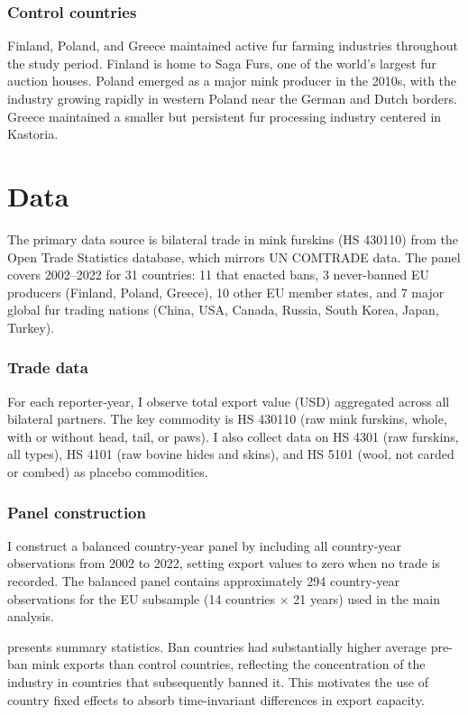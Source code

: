 \documentclass[12pt]{article}
\begin{document}
\subsubsection*{Control countries} Finland, Poland, and Greece maintained active fur farming industries throughout the study period. Finland is home to Saga Furs, one of the world's largest fur auction houses. Poland emerged as a major mink producer in the 2010s, with the industry growing rapidly in western Poland near the German and Dutch borders. Greece maintained a smaller but persistent fur processing industry centered in Kastoria.

\section{Data}\label{sec:data}

The primary data source is bilateral trade in mink furskins (HS 430110) from the Open Trade Statistics database, which mirrors UN COMTRADE data. The panel covers 2002--2022 for 31 countries: 11 that enacted bans, 3 never-banned EU producers (Finland, Poland, Greece), 10 other EU member states, and 7 major global fur trading nations (China, USA, Canada, Russia, South Korea, Japan, Turkey).

\subsubsection*{Trade data} For each reporter-year, I observe total export value (USD) aggregated across all bilateral partners. The key commodity is HS 430110 (raw mink furskins, whole, with or without head, tail, or paws). I also collect data on HS 4301 (raw furskins, all types), HS 4101 (raw bovine hides and skins), and HS 5101 (wool, not carded or combed) as placebo commodities.

\subsubsection*{Panel construction} I construct a balanced country-year panel by including all country-year observations from 2002 to 2022, setting export values to zero when no trade is recorded. The balanced panel contains approximately 294 country-year observations for the EU subsample (14 countries $\times$ 21 years) used in the main analysis.

 presents summary statistics. Ban countries had substantially higher average pre-ban mink exports than control countries, reflecting the concentration of the industry in countries that subsequently banned it. This motivates the use of country fixed effects to absorb time-invariant differences in export capacity.
\end{document}
